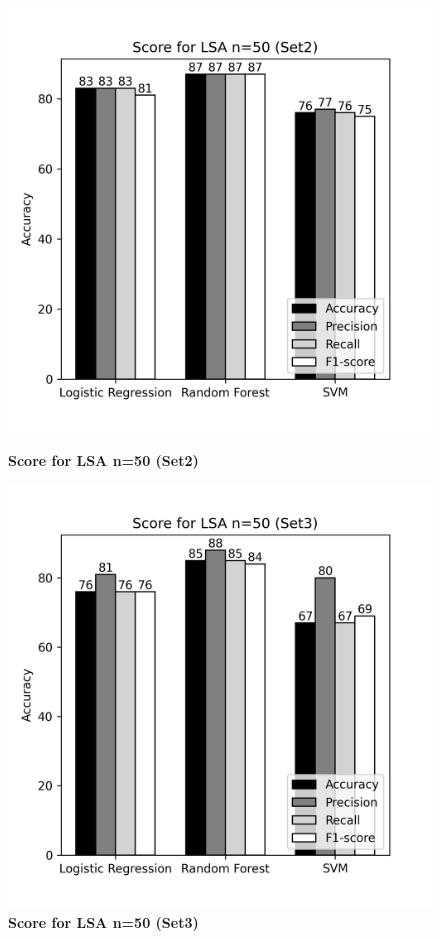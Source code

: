 \documentclass[12pt]{report}
\begin{document}
             \begin{figure}[!htb]
                \begin{minipage}{0.48\textwidth}
                  \centering
                  \includegraphics[scale=0.55]{plots/Score for LSA n=50 (Set2).png}
                  \caption{\textbf{Score for LSA n=50 (Set2)}}\label{Fig:typo1}
                \end{minipage}\hfill
                \begin{minipage}{0.48\textwidth}
                  \centering
                  \includegraphics[scale=0.55]{plots/Score for LSA n=50 (Set3).png}
                  \caption{\textbf{Score for LSA n=50 (Set3)}}\label{Fig:typo2}
                \end{minipage}
             \end{figure}
\end{document}
